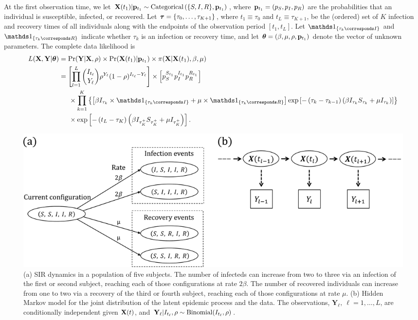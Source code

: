 At the first observation time, we let $ \mathbf{X}(t_1)|\mathbf{p}_{t_1} \sim \mathrm{Categorical}\left (\lbrace S,I,R\rbrace, \mathbf{p}_{t_1}\right ) $, where $ \mathbf{p}_{t_1}=\left(p_{S}, p_{I},p_{R}\right) $ are the probabilities that an individual is susceptible, infected, or recovered. Let $ \boldsymbol{\tau} = \lbrace\tau_0,\dots,\tau_{K+1}\rbrace $, where $ t_1 \equiv \tau_0 $ and $ t_L \equiv \tau_{K+1} $, be the (ordered) set of $ K $ infection and recovery times of all individuals along with the endpoints of the observation period $ [t_1,t_L] $. Let $ \ind{\tau_k \corresponds I} $ and $ \ind{\tau_k \corresponds R} $ indicate whether $ \tau_k $ is an infection or recovery time, and let $ \boldsymbol{\theta} = (\beta, \mu, \rho, \mathbf{p}_{t_1}) $ denote the vector of unknown parameters. The complete data likelihood is 
\begin{align} 
\label{eqn:bda_comp_data_likelihood}
L(\bX, \bY | \btheta) &= \Pr(\bY|\bX, \rho)\times \Pr(\bX(t_1)|\bp_{t_1}) \times \pi(\bX |\bX(t_1),\beta, \mu) \nonumber \\
&=  \left [ \prod_{l = 1}^{L}\binom{I_{t_\ell}}{Y_\ell}  \rho^{Y_\ell}(1-\rho)^{I_{t_\ell} - Y_\ell}\right ] \times \left [p_{S}^{S_{t_1}} p_{I}^{I_{t_1}}p_{R}^{R_{t_1}}\right ]  \nonumber\\
&\hspace{0.2in} \times \prod_{k = 1}^{K}\left \lbrace \left [\beta I_{\tau_k}\times\ind{\tau_k \corresponds I} + \mu\times\ind{\tau_k \corresponds R}\right ] \exp{\left [-\left (\tau_k - \tau_{k-1}\right )\left (\beta I_{\tau_k} S_{\tau_k} + \mu I_{\tau_k}\right )\right ]}\right \rbrace \nonumber \\
& \hspace{0.2in} \times \exp \left [-\left (t_L - \tau_K\right )\left (\beta I_{\tau_K^+}S_{\tau_K^+} + \mu I_{\tau_K^+}\right )\right ]. 
\end{align}

\begin{figure}
	\centering
	\includegraphics[width=0.95\linewidth]{figures/SIRdynamics_HMM}
	\caption[Diagram of subject--level state transitions and HMM structure for an SIR model.]{(a) SIR dynamics in a population of five subjects. The number of infecteds can increase from two to three via an infection of the first or second subject, reaching each of those configurations at rate $ 2\beta $. The number of recovered individuals can increase from one to two via a recovery of the third or fourth subject, reaching each of those configurations at rate $ \mu $. (b) Hidden Markov model for the joint distribution of the latent epidemic process and the data. The observations, $\mathbf{Y}_\ell,\ \ell=1,\dots,L$, are conditionally independent given $\mathbf{X}(t)$, and $ \mathbf{Y}_\ell | I_{t_\ell}, \rho\sim\mathrm{Binomial}(I_{t_\ell}, \rho) $.}
	\label{fig:bda_SIRdynamics_HMM}
\end{figure}

